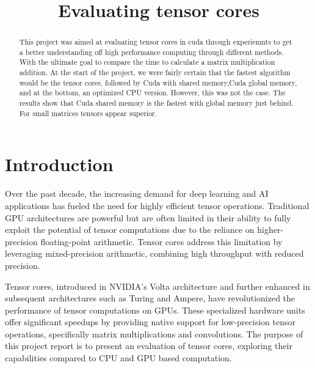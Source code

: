 \documentclass[conference]{IEEEtran}
\begin{document}
\title{Evaluating tensor cores}


\author{
}

\maketitle

\begin{abstract}\label{sec:abstract}
This project was aimed at evaluating tensor cores in cuda through experiemnts to get a better understanding off
high performance computing through different methods. With the ultimate goal to compare the time to calculate a
matrix multiplication addition. At the start of the project, we were fairly certain that the fastest algorithm would be 
the tensor cores, followed by Cuda with shared memory,Cuda global memory, and at the bottom, an optimized CPU version. However, this was not the case.
The results show that Cuda shared memory is the fastest with global memory just behind. For small matrices tensors appear superior.
\end{abstract}

\section{Introduction}\label{sec:intro}


Over the past decade, the increasing demand for deep learning and AI applications has
fueled the need for highly efficient tensor operations. Traditional GPU architectures are powerful but 
are often limited in their ability to fully exploit the potential of 
tensor computations due to the reliance on higher-precision floating-point arithmetic. 
Tensor cores address this limitation by leveraging mixed-precision arithmetic, combining 
high throughput with reduced precision.

Tensor cores, introduced in NVIDIA's Volta architecture and further enhanced in 
subsequent architectures such as Turing and Ampere, have revolutionized the performance of 
tensor computations on GPUs. These specialized hardware units offer significant speedups 
by providing native support for low-precision tensor operations, 
specifically matrix multiplications and convolutions. 
The purpose of this project report is to present an evaluation of tensor cores,
exploring their capabilities compared to CPU and GPU based computation.
\end{document}
